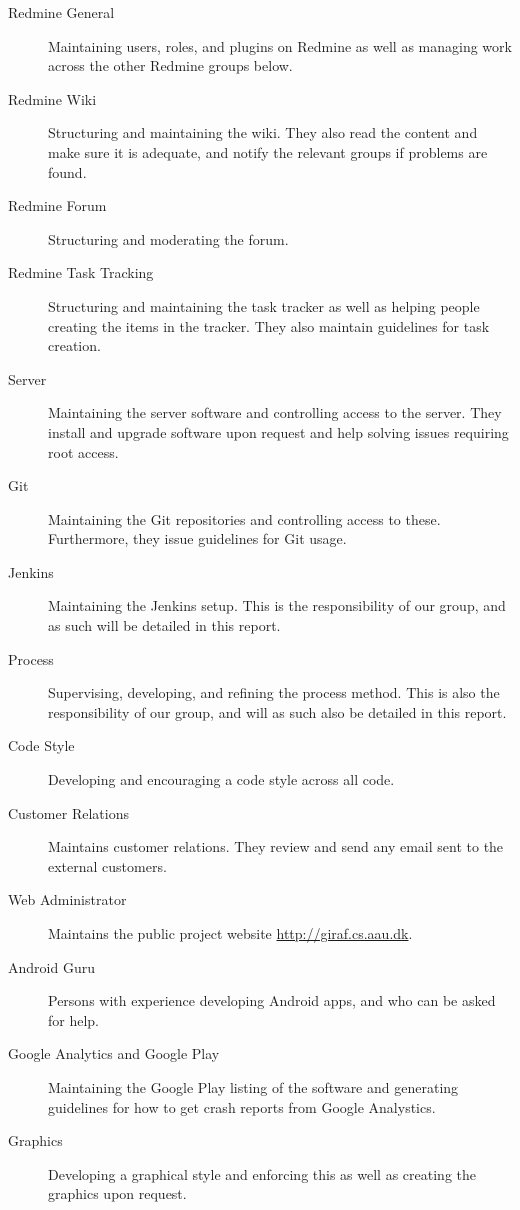 \begin{description}
  \item[Redmine General] Maintaining users, roles, and plugins on Redmine as well as managing work across the other Redmine groups below.
  \item[Redmine Wiki] Structuring and maintaining the wiki. They also read the content and make sure it is adequate, and notify the relevant groups if problems are found.
  \item[Redmine Forum] Structuring and moderating the forum.
  \item[Redmine Task Tracking] Structuring and maintaining the task tracker as well as helping people creating the items in the tracker. They also maintain guidelines for task creation.
  \item[Server] Maintaining the server software and controlling access to the server. They install and upgrade software upon request and help solving issues requiring root access.
  \item[Git] Maintaining the Git repositories and controlling access to these. Furthermore, they issue guidelines for Git usage.
  \item[Jenkins] Maintaining the Jenkins setup. This is the responsibility of our group, and as such will be detailed in this report.
  \item[Process] Supervising, developing, and refining the process method. This is also the responsibility of our group, and will as such also be detailed in this report.
  \item[Code Style] Developing and encouraging a code style across all code.
  \item[Customer Relations] Maintains customer relations. They review and send any email sent to the external customers.
  \item[Web Administrator] Maintains the public project website \url{http://giraf.cs.aau.dk}.
  \item[Android Guru] Persons with experience developing Android apps, and who can be asked for help.
  \item[Google Analytics and Google Play] Maintaining the Google Play listing of the software and generating guidelines for how to get crash reports from Google Analystics.
  \item[Graphics] Developing a graphical style and enforcing this as well as creating the graphics upon request.
\end{description}